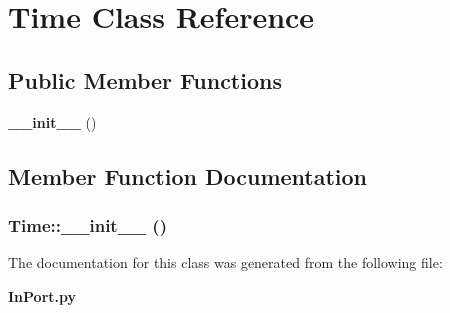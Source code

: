 \section{Time Class Reference}
\label{classTime}
\subsection*{Public Member Functions}
\begin{CompactItemize}
\item 
{\bf \_\-\_\-init\_\-\_\-} ()
\end{CompactItemize}


\subsection{Member Function Documentation}
\subsubsection{\setlength{\rightskip}{0pt plus 5cm}Time::\_\-\_\-init\_\-\_\- ()}\label{classTime_Timea0}




The documentation for this class was generated from the following file:\begin{CompactItemize}
\item 
{\bf In\-Port.py}\end{CompactItemize}
